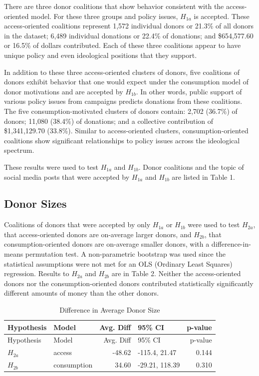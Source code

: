 \documentclass[12pt,]{article}
\begin{document}
There are three donor coalitions that show behavior consistent with the
access-oriented model. For these three groups and policy issues,
\(H_{1a}\) is accepted. These access-oriented coalitions represent 1,572
individual donors or 21.3\% of all donors in the dataset; 6,489
individual donations or 22.4\% of donations; and \$654,577.60 or 16.5\%
of dollars contributed. Each of these three coalitions appear to have
unique policy and even ideological positions that they support.

In addition to these three access-oriented clusters of donors, five
coalitions of donors exhibit behavior that one would expect under the
consumption model of donor motivations and are accepted by \(H_{1b}\).
In other words, public support of various policy issues from campaigns
predicts donations from these coalitions. The five consumption-motivated
clusters of donors contain: 2,702 (36.7\%) of donors; 11,080 (38.4\%) of
donations; and a collective contribution of \$1,341,129.70 (33.8\%).
Similar to access-oriented clusters, consumption-oriented coalitions
show significant relationships to policy issues across the ideological
spectrum.

These results were used to test \(H_{1a}\) and \(H_{1b}\). Donor
coalitions and the topic of social media posts that were accepted by
\(H_{1a}\) and \(H_{1b}\) are listed in Table 1.

\hypertarget{donor-sizes}{%
\subsection{Donor Sizes}\label{donor-sizes}}

Coalitions of donors that were accepted by only \(H_{1a}\) or \(H_{1b}\)
were used to test \(H_{2a}\), that access-oriented donors are on-average
larger donors, and \(H_{2b}\), that consumption-oriented donors are
on-average smaller donors, with a difference-in-means permutation test.
A non-parametric bootstrap was used since the statistical assumptions
were not met for an OLS (Ordinary Least Squares) regression. Results to
\(H_{2a}\) and \(H_{2b}\) are in Table 2. Neither the access-oriented
donors nor the consumption-oriented donors contributed statistically
significantly different amounts of money than the other donors.

\begin{longtable}[]{@{}llrlr@{}}
\caption{Difference in Average Donor Size}\tabularnewline
\toprule
Hypothesis & Model & Avg. Diff & 95\% CI & p-value \\
\midrule
\endfirsthead
\toprule
Hypothesis & Model & Avg. Diff & 95\% CI & p-value \\
\midrule
\endhead
\(H_{2a}\) & access & -48.62 & -115.4, 21.47 & 0.144 \\
\(H_{2b}\) & consumption & 34.60 & -29.21, 118.39 & 0.310 \\
\bottomrule
\end{longtable}
\end{document}
